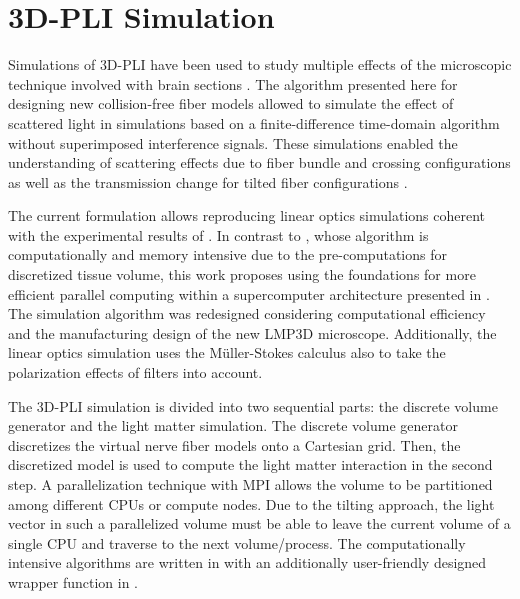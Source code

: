 \cleardoublepage
\setcounter{chapter}{5}
\chapter{\acs{3D-PLI} Simulation}
\label{cha:sof:simulation}
%
Simulations of \ac{3D-PLI} have been used to study multiple effects of the microscopic technique involved with brain sections \cite{Dohmen2015,Menzel2015,Menzel2016,Menzel2020,Menzel2021,MenzelMaster,MenzelDissertation}.
The algorithm presented here for designing new collision-free fiber models allowed to simulate the effect of scattered light in  simulations based on a finite-difference time-domain algorithm without superimposed interference signals.
These simulations enabled the understanding of scattering effects due to fiber bundle and crossing configurations as well as the transmission change for tilted fiber configurations \cite{MenzelDissertation,Menzel2020,Menzel2021}.
\par
%
The current formulation allows reproducing linear optics simulations coherent with the experimental results of \cite{Dohmen2015,Menzel2015,Menzel2016}.
In contrast to \cite{Dohmen2015,Menzel2015,Menzel2016}, whose algorithm is computationally and memory intensive due to the pre-computations for discretized tissue volume, this work proposes using the foundations for more efficient parallel computing within a supercomputer architecture presented in \cite{Lucksch2016}.
The simulation algorithm was redesigned considering computational efficiency and the manufacturing design of the new \ac{LMP3D} microscope.
Additionally, the linear optics simulation uses the M{\"u}ller-Stokes calculus also to take the polarization effects of filters into account.
\par
%
The \ac{3D-PLI} simulation is divided into two sequential parts: the discrete volume generator and the light matter simulation.
The discrete volume generator discretizes the virtual nerve fiber models onto a Cartesian grid.
Then, the discretized model is used to compute the light matter interaction in the second step.
A parallelization technique with \ac{MPI} allows the volume to be partitioned among different \acp{CPU} or compute nodes.
Due to the tilting approach, the light vector in such a parallelized volume must be able to leave the current volume of a single \ac{CPU} and traverse to the next volume/process.
The computationally intensive algorithms are written in \cpp{} with an additionally user-friendly designed wrapper function in \python{}.
%
%
%
